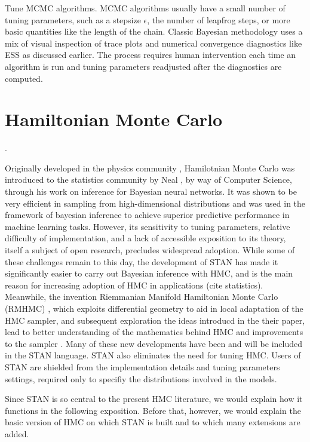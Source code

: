 \documentclass[12pt]{report}
\begin{document}
Tune MCMC algorithms. MCMC algorithms usually have a small number of tuning
parameters, such as a stepsize $\epsilon$, the number of leapfrog steps, or more
basic quantities like the length of the chain. Classic Bayesian methodology
\cite{robert2013monte} uses a mix of visual inspection of trace plots and
numerical convergence diagnostics like ESS as discussed earlier. The process
requires human intervention each time an algorithm is run and tuning parameters
readjusted after the diagnostics are computed. 


\section{ Hamiltonian Monte Carlo }. 

Originally developed in the physics community \cite{duane1987hybrid},
Hamilotnian Monte Carlo was introduced to the statistics community by Neal
\cite{neal2012bayesian}, 
by way of Computer Science, through his work on inference for Bayesian neural
networks. It was shown to be very efficient in sampling from high-dimensional
distributions and was used in the framework of bayesian inference to achieve superior predictive
performance in machine learning tasks\cite{guyon2004result}. However, its sensitivity to tuning parameters, relative difficulty of
implementation, and a lack of accessible
exposition to its theory, itself a subject of open research, precludes
widespread adoption. While some of these challenges remain to this day, the development of STAN \cite{carpenter2016stan} has made it significantly easier to carry out Bayesian inference with HMC, and is the main reason for increasing adoption of HMC in applications (cite statistics). Meanwhile, the invention Riemmanian Manifold Hamiltonian Monte Carlo (RMHMC) \cite{girolami2011riemann}, which exploits differential geometry to aid in local adaptation of the HMC sampler, and subsequent exploration the ideas introducd in the their paper, lead to better understanding of the mathematics behind HMC \cite{livingstone2016geometric,betancourt2014geometric} and  improvements to the sampler \cite{betancourt2013generalizing,betancourt2013general}. Many of these new developments have been and will be included in the STAN language. STAN also eliminates the need for tuning HMC. Users of STAN are shielded from the implementation details and tuning parameters settings, required only to specifiy the distributions involved in the models. 

Since STAN is so central to the present HMC literature, we would explain how it functions in the following exposition. Before that, however, we would explain the basic version of HMC on which STAN is built and to which many extensions are added. 
\end{document}
